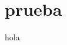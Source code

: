 \documentclass[twoside,12pt]{Latex/Classes/PhDthesisPSnPDF}
\begin{document}
	



\chapter{prueba}

hola \cite{web_arquetipos}

%	









	
	
	
	
	


\backmatter











%
%
%
\end{document}
